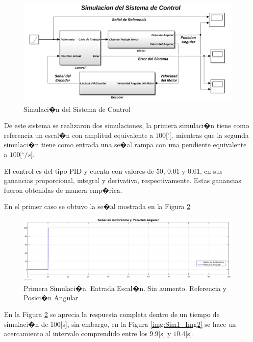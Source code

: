 \documentclass[10pt,a4paper]{book}
\begin{document}
\begin{figure}[H]
	\centering
		\includegraphics[scale=0.3]{Imagenes/SRD/Esquema.png}
	\caption{Simulaci�n del Sistema de Control}
	\label{img:Sis_Control}
\end{figure}


De este sistema se realizaron dos simulaciones, la primera simulaci�n tiene como referencia un escal�n con amplitud equivalente a $100$[$^\circ$], mientras que la segunda simulaci�n tiene como entrada una se�al rampa con una pendiente equivalente a $100$[$^\circ/s$].

El control es del tipo PID y cuenta con valores de $50$, $0.01$ y $0.01$, en sus ganancias proporcional, integral y derivativa, respectivamente. Estas ganancias fueron obtenidas de manera emp�rica.

En el primer caso se obtuvo la se�al mostrada en la Figura \ref{img:Sim1_Img1}

\begin{figure}[H]
	\centering
		\includegraphics[scale=0.3]{Imagenes/SRD/Sim1_Img1.png}
	\caption{Primera Simulaci�n. Entrada Escal�n. Sin aumento. Referencia y Posici�n Angular}
	\label{img:Sim1_Img1}
\end{figure}

En la Figura \ref{img:Sim1_Img1} se aprecia la respuesta completa dentro de un tiempo de simulaci�n de $100$[s], sin embargo, en la Figura \ref{img:Sim1_Img2} se hace un acercamiento al intervalo comprendido entre los $9.9$[s] y $10.4$[s].
\end{document}
